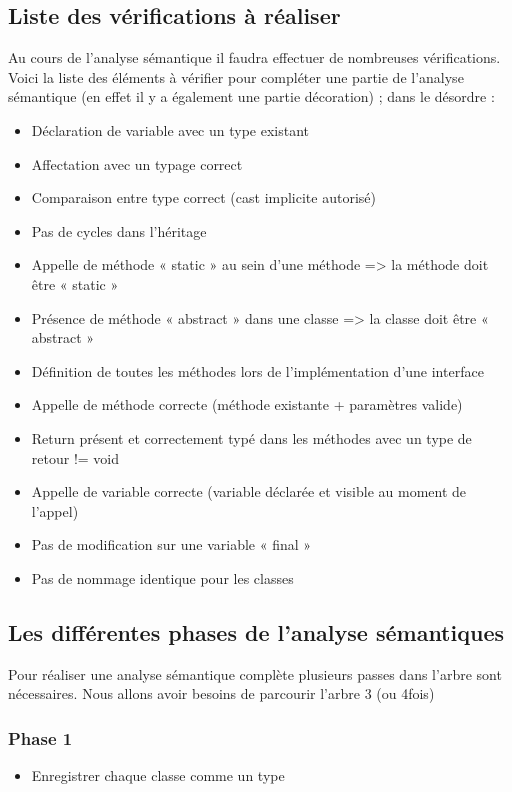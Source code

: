 \documentclass{../../res/univ-projet}
\begin{document}
 \subsection{Liste des vérifications à réaliser}
  Au cours de l’analyse sémantique il faudra effectuer de nombreuses vérifications. Voici la liste des
  éléments à vérifier pour compléter une partie de l’analyse sémantique (en effet il y a également une
  partie décoration) ; dans le désordre : %
  \begin{itemize}
    \item Déclaration de variable avec un type existant
    \item Affectation avec un typage correct
    \item Comparaison entre type correct (cast implicite autorisé)
    \item Pas de cycles dans l’héritage
    \item Appelle de méthode « static » au sein d’une méthode => la méthode doit être « static »
    \item Présence de méthode « abstract » dans une classe => la classe doit être « abstract »
    \item Définition de toutes les méthodes lors de l’implémentation d’une interface
    \item Appelle de méthode correcte (méthode existante + paramètres valide)
    \item Return présent et correctement typé dans les méthodes avec un type de retour != void
    \item Appelle de variable correcte (variable déclarée et visible au moment de l’appel)
    \item Pas de modification sur une variable « final »
    \item Pas de nommage identique pour les classes
  \end{itemize}

 \subsection{Les différentes phases de l’analyse sémantiques}
  Pour réaliser une analyse sémantique complète plusieurs passes dans l’arbre sont nécessaires.
  Nous allons avoir besoins de parcourir l’arbre 3 (ou 4fois)

  \subsubsection{Phase 1}
  \begin{itemize}
    \item Enregistrer chaque classe comme un type
  \end{itemize}
\end{document}

